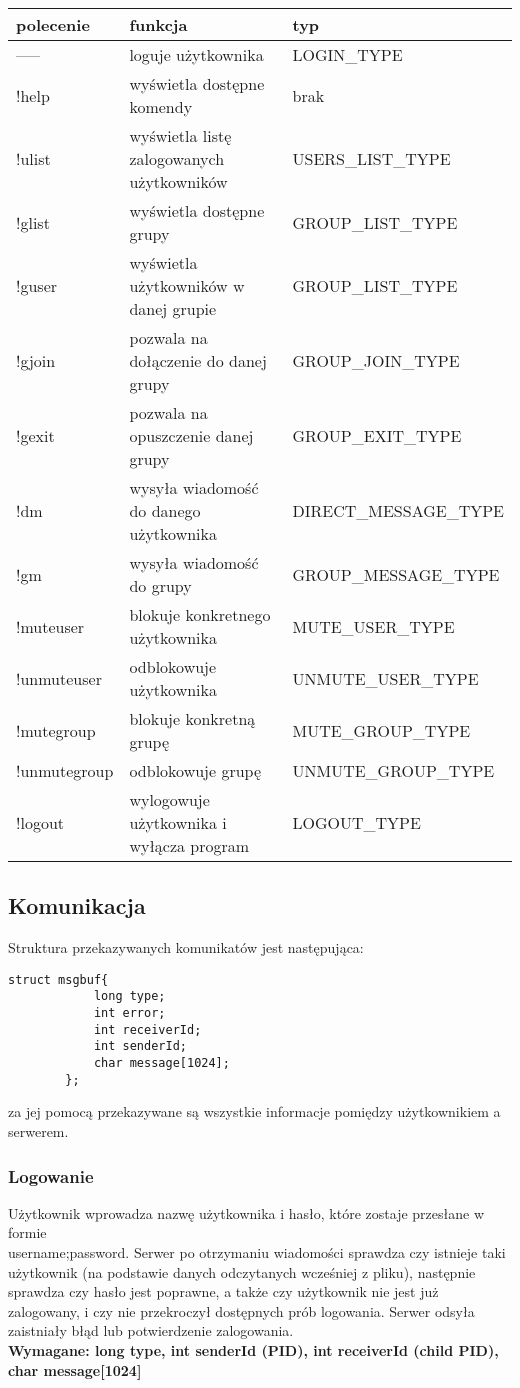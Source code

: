 \documentclass[11pt]{article}
\begin{document}
\begin{table}[!ht]
	\centering
	\begin{tabular}{|l|l|l|}
		\hline
		\textbf{polecenie} & \textbf{funkcja} & \textbf{typ} \\ \hline
		----- & loguje użytkownika & LOGIN\_TYPE \\ \hline
		!help & wyświetla dostępne komendy & brak \\ \hline
		!ulist & wyświetla listę zalogowanych użytkowników & USERS\_LIST\_TYPE \\ \hline
		!glist & wyświetla dostępne grupy & GROUP\_LIST\_TYPE \\ \hline
		!guser & wyświetla użytkowników w danej grupie & GROUP\_LIST\_TYPE \\ \hline
		!gjoin & pozwala na dołączenie do danej grupy & GROUP\_JOIN\_TYPE \\ \hline
		!gexit & pozwala na opuszczenie danej grupy & GROUP\_EXIT\_TYPE \\ \hline
		!dm & wysyła wiadomość do danego użytkownika& DIRECT\_MESSAGE\_TYPE \\ \hline
		!gm & wysyła wiadomość do grupy & GROUP\_MESSAGE\_TYPE \\ \hline
		!muteuser & blokuje konkretnego użytkownika & MUTE\_USER\_TYPE \\ \hline
		!unmuteuser & odblokowuje użytkownika & UNMUTE\_USER\_TYPE \\ \hline
		!mutegroup & blokuje konkretną grupę & MUTE\_GROUP\_TYPE \\ \hline
		!unmutegroup & odblokowuje grupę & UNMUTE\_GROUP\_TYPE \\ \hline
		!logout & wylogowuje użytkownika i wyłącza program & LOGOUT\_TYPE\\ \hline
	\end{tabular}
\end{table}
\pagebreak
	\subsection{Komunikacja}
	Struktura przekazywanych komunikatów jest następująca:
		\begin{lstlisting}[style = CStyle]
		struct msgbuf{
			long type;
			int error;
			int receiverId;
			int senderId;
			char message[1024];
		};\end{lstlisting}
	za jej pomocą przekazywane są wszystkie informacje pomiędzy użytkownikiem a serwerem.
	
	\subsubsection{Logowanie}
	Użytkownik wprowadza nazwę użytkownika i hasło, które zostaje przesłane w formie\\ username;password. Serwer po otrzymaniu wiadomości sprawdza czy istnieje taki użytkownik (na podstawie danych odczytanych wcześniej z pliku), następnie sprawdza czy hasło jest poprawne, a także czy użytkownik nie jest już zalogowany, i czy nie przekroczył dostępnych prób logowania. Serwer odsyła zaistniały błąd lub potwierdzenie zalogowania.\\
	\textbf{Wymagane: long type, int senderId (PID), int receiverId (child PID), char message[1024]}
\end{document}
